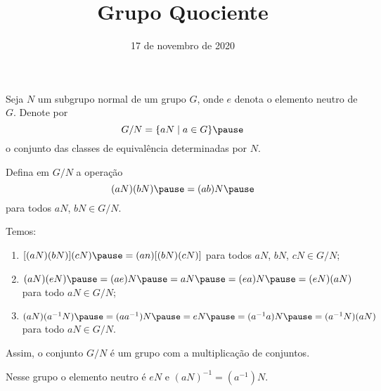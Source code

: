 \documentclass{beamer}
\title{Grupo Quociente}
\author[\autor]{\autor}
\institute[\instituto]{\instituto}
\date{17 de novembro de 2020}
\begin{document}
    \begin{frame}
        \maketitle
    \end{frame}


    \begin{frame}
        Seja $N$ um subgrupo normal \pause de um grupo $G$, onde $e$ denota o elemento neutro de $G$. \pause Denote por \pause
        \[
            G/N = \{aN \mid a \in G\} \pause
        \]
        o conjunto das classes de equival\^encia determinadas por $N$. \pause
        
        \vspace{.5cm}

        Defina em $G/N$ a opera\c{c}\~ao \pause
        \[
            (aN)(bN)  \pause = (ab)N \pause
        \]
        para todos $aN$, $bN \in G/N$.
    \end{frame}

    \begin{frame}
        Temos: \pause

        \vspace{.3cm}
        
        \begin{enumerate}[label={\roman*})]
            \item $[(aN)(bN)](cN) \pause = (an)[(bN)(cN)]$ \pause para todos $aN$, $bN$, $cN \in G/N$; \pause

            \vspace{.3cm}
        
            \item $(aN)(eN) \pause = (ae)N \pause = aN \pause = (ea)N \pause = (eN)(aN)$ \pause para todo $aN \in G/N$; \pause

            \vspace{.3cm}
        
            \item $(aN)(a^{-1}N) \pause = (aa^{-1})N \pause = eN \pause = (a^{-1}a)N \pause = (a^{-1}N)(aN)$ \pause para todo $aN \in G/N$. \pause

            \vspace{.3cm}
        \end{enumerate}

        Assim, o conjunto $G/N$ \'e um grupo com a multiplica\c{c}\~ao de conjuntos. \pause

        \vspace{.3cm}
        
        Nesse grupo o elemento neutro \'e $eN$ \pause e $(aN)^{-1} = (a^{-1})N$.
    \end{frame}
\end{document}

